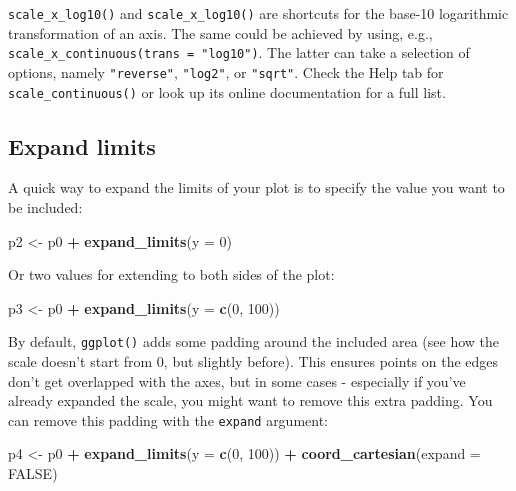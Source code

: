 \documentclass[
  12pt,
  krantz2]{krantz}
\makeatletter
\newenvironment{Shaded}{\begin{snugshade}}{\end{snugshade}}
\newcommand{\DataTypeTok}[1]{\textcolor[rgb]{0.13,0.29,0.53}{#1}}
\newcommand{\DecValTok}[1]{\textcolor[rgb]{0.00,0.00,0.81}{#1}}
\newcommand{\KeywordTok}[1]{\textcolor[rgb]{0.13,0.29,0.53}{\textbf{#1}}}
\newcommand{\NormalTok}[1]{#1}
\newcommand{\OperatorTok}[1]{\textcolor[rgb]{0.81,0.36,0.00}{\textbf{#1}}}
\newcommand{\OtherTok}[1]{\textcolor[rgb]{0.56,0.35,0.01}{#1}}
\newcommand{\StringTok}[1]{\textcolor[rgb]{0.31,0.60,0.02}{#1}}
\newenvironment{kframe}{%
\medskip{}
\setlength{\fboxsep}{.8em}
 \def\at@end@of@kframe{}%
 \ifinner\ifhmode%
  \def\at@end@of@kframe{\end{minipage}}%
  \begin{minipage}{\columnwidth}%
 \fi\fi%
 \def\FrameCommand##1{\hskip\@totalleftmargin \hskip-\fboxsep
 \colorbox{shadecolor}{##1}\hskip-\fboxsep
     \hskip-\linewidth \hskip-\@totalleftmargin \hskip\columnwidth}%
 \MakeFramed {\advance\hsize-\width
   \@totalleftmargin\z@ \linewidth\hsize
   \@setminipage}}%
 {\par\unskip\endMakeFramed%
 \at@end@of@kframe}
\renewenvironment{Shaded}{\begin{kframe}}{\end{kframe}}
\makeatother
\begin{document}
\texttt{scale\_x\_log10()} and \texttt{scale\_x\_log10()} are shortcuts for the base-10 logarithmic transformation of an axis.
The same could be achieved by using, e.g., \texttt{scale\_x\_continuous(trans\ =\ "log10")}.
The latter can take a selection of options, namely \texttt{"reverse"}, \texttt{"log2"}, or \texttt{"sqrt"}.
Check the Help tab for \texttt{scale\_continuous()} or look up its online documentation for a full list.

\hypertarget{expand-limits}{%
\subsection{Expand limits}\label{expand-limits}}


A quick way to expand the limits of your plot is to specify the value you want to be included:

\begin{Shaded}
\begin{Highlighting}[]
\NormalTok{p2 <-}\StringTok{ }\NormalTok{p0 }\OperatorTok{+}\StringTok{ }\KeywordTok{expand_limits}\NormalTok{(}\DataTypeTok{y =} \DecValTok{0}\NormalTok{)}
\end{Highlighting}
\end{Shaded}

Or two values for extending to both sides of the plot:

\begin{Shaded}
\begin{Highlighting}[]
\NormalTok{p3 <-}\StringTok{ }\NormalTok{p0 }\OperatorTok{+}\StringTok{ }\KeywordTok{expand_limits}\NormalTok{(}\DataTypeTok{y =} \KeywordTok{c}\NormalTok{(}\DecValTok{0}\NormalTok{, }\DecValTok{100}\NormalTok{))}
\end{Highlighting}
\end{Shaded}

By default, \texttt{ggplot()} adds some padding around the included area (see how the scale doesn't start from 0, but slightly before).
This ensures points on the edges don't get overlapped with the axes, but in some cases - especially if you've already expanded the scale, you might want to remove this extra padding.
You can remove this padding with the \texttt{expand} argument:

\begin{Shaded}
\begin{Highlighting}[]
\NormalTok{p4 <-}\StringTok{ }\NormalTok{p0 }\OperatorTok{+}
\StringTok{  }\KeywordTok{expand_limits}\NormalTok{(}\DataTypeTok{y =} \KeywordTok{c}\NormalTok{(}\DecValTok{0}\NormalTok{, }\DecValTok{100}\NormalTok{)) }\OperatorTok{+}
\StringTok{  }\KeywordTok{coord_cartesian}\NormalTok{(}\DataTypeTok{expand =} \OtherTok{FALSE}\NormalTok{)}
\end{Highlighting}
\end{Shaded}
\end{document}
